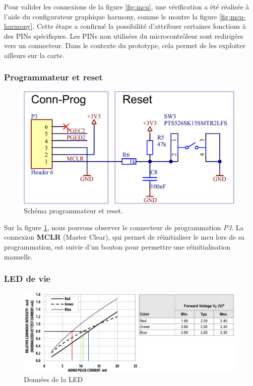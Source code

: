 Pour valider les connexions de la figure \ref{fig:mcu}, une vérification a été réalisée à l'aide du configurateur graphique \gls{harmony}, comme le montre la figure \ref{fig:mcu-harmony}. Cette étape a confirmé la possibilité d'attribuer certaines fonctions à des PINs spécifiques. Les PINs non utilisées du microcontrôleur sont redirigées vers un connecteur. Dans le contexte du prototype, cela permet de les exploiter ailleurs sur la carte.


\subsubsection{Programmateur et reset} 

\begin{figure}[h]
	\centering
	\includegraphics[width=.65\linewidth]{../figures/etude/sch/Prog-Reset}
	\caption{Schéma programmateur et reset.}
	\label{fig:prog-reset}
\end{figure}

Sur la figure \ref{fig:prog-reset}, nous pouvons observer le connecteur de programmation \textit{P3}. La connexion \textbf{MCLR} (Master Clear), qui permet de réinitialiser le \gls{mcu} lors de sa programmation, est suivie d'un bouton pour permettre une réinitialisation manuelle.

\clearpage

\subsubsection{LED de vie} 

\begin{figure}[h]
	\centering
	\includegraphics[width=.9\linewidth]{../figures/etude/DIM-LED}
	\caption{Données de la LED}
	\label{fig:dim-led}
\end{figure}


